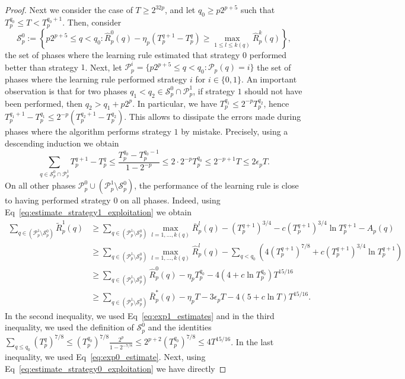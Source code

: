 \documentclass[aos]{imsart}
\theoremstyle{plain}
\theoremstyle{remark}
\newcommand{\Pcal}{\mathcal{P}}
\newcommand{\Scal}{\mathcal{S}}
\newcommand{\1}{\mathbbm{1}}%
\begin{document}
\begin{proof}
Next we consider the case of $T\geq 2^{32p}$, and let $q_0\geq p2^{p+5}$ such that $T^{q_0}_p\leq T<T^{q_0+1}_p$. Then, consider
\begin{equation*}
    \Scal^0_p := \left\{p2^{p+5}\leq q<q_0: \hat R_p^0(q) - \eta_p (T_p^{q+1} - T_p^q)
    \geq \max_{1\leq l\leq k(q)} \hat R_p^k(q)\right\},
\end{equation*}
the set of phases where the learning rule estimated that strategy $0$ performed better than strategy $1$. Next, let $\Pcal^i_p = \{p2^{p+5}\leq q<q_0: \Pcal_p(q)=i\}$ the set of phases where the learning rule performed strategy $i$ for $i\in\{0,1\}$. An important observation is that for two phases $q_1<q_2\in\Scal^0_p\cap\Pcal^1_p$, if strategy $1$ should not have been performed, then $q_2>q_1+p2^p$. In particular, we have $T^{q_1}_p\leq 2^{-p} T^{q_2}_p$, hence $T^{q_1+1}_p-T^{q_1}_p \leq  2^{-p}(T^{q_2+1}_p-T^{q_2}_p)$. This allows to dissipate the errors made during phases where the algorithm performs strategy $1$ by mistake. Precisely, using a descending induction we obtain
\begin{equation*}
    \sum_{q\in \Scal^0_p\cap\Pcal^1_p} T^{q+1}_p - T^q_p \leq \frac{T^{q_0}_p-T^{q_0-1}_p}{1-2^{-p}} \leq 2\cdot 2^{-p}T^{q_0}_p \leq 2^{-p+1}T \leq 2\epsilon_p T.
\end{equation*}
On all other phases $\Pcal^0_p\cup(\Pcal^1_p\setminus\Scal^0_p)$, the performance of the learning rule is close to having performed strategy $0$ on all phases. Indeed, using Eq~\eqref{eq:estimate_strategy1_exploitation} we obtain 
\begin{align*}
    \sum_{q\in (\Pcal^1_p\setminus\Scal^0_p)}\tilde R^1_p(q)
    &\geq \sum_{q\in (\Pcal^1_p\setminus\Scal^0_p)}\max_{l=1,\ldots,k(q)}\bar R^l_p(q) -  (T_p^{q+1})^{3/4} - c(T_p^{q+1})^{3/4} \ln T_p^{q+1} - A_p(q)\\
    &\geq  \sum_{q\in (\Pcal^1_p\setminus\Scal^0_p)}\max_{l=1,\ldots,k(q)}\hat R^l_p(q) - \sum_{q<q_0}\left(4(T_p^{q+1})^{7/8}  + c(T_p^{q+1})^{3/4} \ln T_p^{q+1}\right) \\
    &\geq  \sum_{q\in (\Pcal^1_p\setminus\Scal^0_p)}\hat R^0_p(q) -\eta_pT_p^{q_0} - 4(4+c\ln T_p^{q_0})T^{15/16}\\
    &\geq \sum_{q\in (\Pcal^1_p\setminus\Scal^0_p)}\bar R^*_p(q) -\eta_p T - 3\epsilon_p T - 4(5+c\ln T)T^{15/16}.
\end{align*}
In the second inequality, we used Eq~\eqref{eq:exp1_estimates} and in the third inequality, we used the definition of $\Scal^0_p$ and the identities $\sum_{q\leq q_0} (T_p^q)^{7/8} \leq (T_p^{q_0})^{7/8}\frac{2^p}{1-2^{-7/8}}\leq 2^{p+2}(T_p^{q_0})^{7/8} \leq 4 T^{15/16}$. In the last inequality, we used Eq~\eqref{eq:exp0_estimate}. Next, using Eq~\eqref{eq:estimate_strategy0_exploitation} we have directly

\end{proof}
\end{document}
